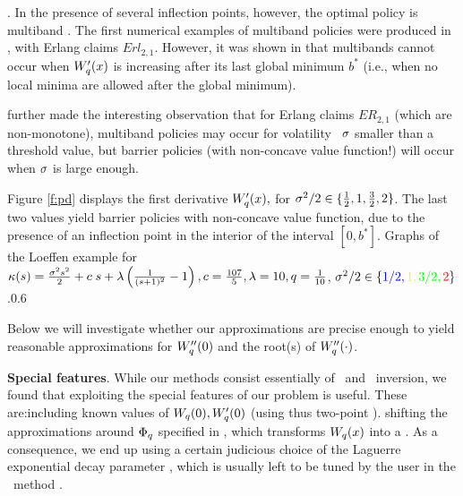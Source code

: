 .
  In the presence of several inflection points, however,  the optimal policy is multiband \cite{AM05,Schmidli,Loef,APP15}.
The first numerical examples of multiband policies  were produced in \cite{AM05,Loef}, with  Erlang claims $Erl_{2,1}$. However, it was shown in \cite{Loef} that multibands cannot occur when $W'_q(x)$ is increasing after its  last global minimum  $b^*$ (i.e., when no local minima are allowed after the global minimum).


  \cite{Loef} further made the interesting  observation that for Erlang claims $ER_{2,1}$  (which are non-monotone), multiband policies may occur  for volatility \pars \ $\sigma$ smaller than a threshold value, but  barrier policies (with non-concave value function!) will occur when $\sigma$ is large  enough.

 Figure \ref{f:pd} displays the first derivative $W_q'(x),$ for $\sigma^2/2 \in \{\frac{1}{2}, 1,\frac{3}{2},2\}$. The last two values yield barrier policies with non-concave value function, due to the presence of an inflection point in the interior of the interval $[0,b^*]$.
   {Graphs of the Loeffen example for $\kappa(s)= \frac{\sigma^2 s^2}{2}+c \; s+\lambda
   \left(\frac{1}{(s+1)^2}-1\right), c=\frac{107 }{5}, \lambda=10, q=\frac{1}{10} $, $\s^2/2 \in \{ \color{blue} 1/2, \color{yellow}1, \color{green} 3/2, \color{red} 2 \color{black}\} $.}{0.6}




\EEN

 Below we will investigate whether our approximations are precise enough to
 yield reasonable approximations for $ W''_q(0) $ and the root(s) of $
 W''_q(\cdot)$.

{\bf Special features}. While our methods consist essentially of \Pd \
and \LTW \LT \ inversion, we found that exploiting the special features of
our problem is useful. These are:\BEN \im including known values of
$W_q(0), W_q'(0)$ (using thus two-point \Pds). \im shifting the
approximations around $\Phi_q$ specified in \eqr{Fq}, which transforms
$W_q(x)$ into a \surp. As a consequence, we end up using a certain
judicious choice of the Laguerre exponential decay parameter ,
which is usually left to be tuned by the user in the \LTW \
method \cite{weideman1999algorithms}.
\EEN

